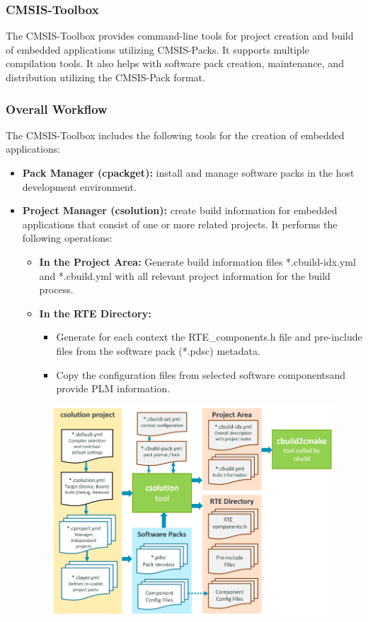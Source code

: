 \subsubsection{CMSIS-Toolbox}
The CMSIS-Toolbox provides command-line tools for project creation and build of embedded applications utilizing CMSIS-Packs. It supports multiple compilation tools. It also helps with software pack creation, maintenance, and distribution utilizing the CMSIS-Pack format.
\subsubsection*{Overall Workflow}
The CMSIS-Toolbox includes the following tools for the creation of embedded applications:
\begin{itemize}
	\item \textbf{ Pack Manager (cpackget):} install and manage software packs in the host development environment.
	\item \textbf{Project Manager (csolution):} create build information for embedded applications that consist of one or more related projects. It performs the following operations:
	\begin{itemize}
		\item \textbf{In the Project Area:} Generate build information files *.cbuild-idx.yml and *.cbuild.yml with all relevant project information for the build process.
		\item \textbf{In the RTE Directory:}
		\begin{itemize}
			\item Generate for each context the RTE\_components.h file and pre-include files from the software pack (*.pdsc) metadata.
			\item Copy the configuration files from selected software componentsand provide PLM information.
		\end{itemize}
	\end{itemize}
	\begin{figure}[H]
		\centering
		\includegraphics[width=15cm]{img/ST_Summer_Internship/csolution-operation.png}

\end{figure}
\end{itemize}

